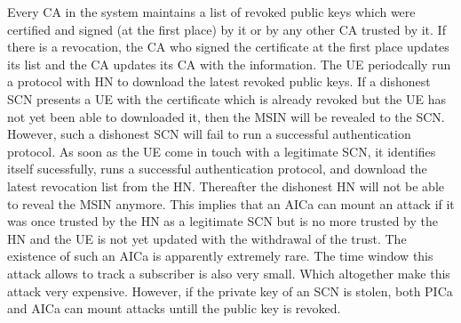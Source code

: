 \documentclass[lnicst,sechang,a4paper]{svmultln}
\begin{document}
Every CA in the system maintains a list of revoked public keys which were certified and signed (at the first place) by it or by any other CA trusted by it. If there is a revocation, the CA who signed the certificate at the first place updates its list and the CA updates its CA with the information. The UE periodcally run a protocol with HN to download the latest revoked public keys. If a dishonest SCN presents a UE with the certificate which is already revoked but the UE has not yet been able to downloaded it, then the MSIN will be revealed to the SCN. However, such a dishonest SCN will fail to run a successful authentication protocol. As soon as the UE come in touch with a legitimate SCN, it identifies itself sucessfully, runs a successful authentication protocol, and download the latest revocation list from the HN. Thereafter the dishonest HN will not be able to reveal the MSIN anymore. This implies that an AICa can mount an attack if it was once trusted by the HN as a legitimate SCN but is no more trusted by the HN and the UE is not yet updated with the withdrawal of the trust. The existence of such an AICa is apparently extremely rare. The time window this attack allows to track a subscriber is also very small. Which altogether make this attack very expensive. However, if the private key of an SCN is stolen, both PICa and AICa can mount attacks untill the public key is revoked. 
\end{document}
